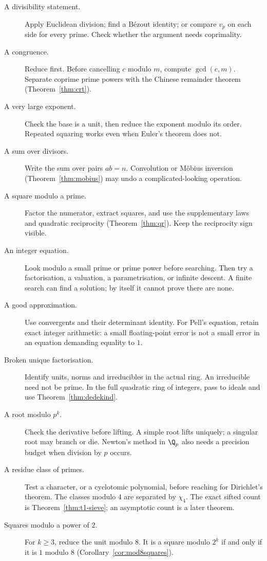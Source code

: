 \begin{description}
\item[A divisibility statement.] Apply Euclidean division; find a B\'ezout identity; or compare $v_p$ on each
side for every prime. Check whether the argument needs coprimality.
\item[A congruence.] Reduce first. Before cancelling $c$ modulo $m$, compute $\gcd(c,m)$. Separate coprime prime
powers with the Chinese remainder theorem (Theorem~\ref{thm:crt}).
\item[A very large exponent.] Check the base is a unit, then reduce the exponent modulo its order. Repeated
squaring works even when Euler's theorem does not.
\item[A sum over divisors.] Write the sum over pairs $ab=n$. Convolution or M\"obius inversion
(Theorem~\ref{thm:mobius}) may undo a complicated-looking operation.
\item[A square modulo a prime.] Factor the numerator, extract squares, and use the supplementary laws and
quadratic reciprocity (Theorem~\ref{thm:qr}). Keep the reciprocity sign visible.
\item[An integer equation.] Look modulo a small prime or prime power before searching. Then try a factorisation,
a valuation, a parametrisation, or infinite descent. A finite search can find a solution; by itself it cannot
prove there are none.
\item[A good approximation.] Use convergents and their determinant identity. For Pell's equation, retain exact
integer arithmetic: a small floating-point error is not a small error in an equation demanding equality to $1$.
\item[Broken unique factorisation.] Identify units, norms and irreducibles in the actual ring. An irreducible need
not be prime. In the full quadratic ring of integers, pass to ideals and use Theorem~\ref{thm:dedekind}.
\item[A root modulo $p^k$.] Check the derivative before lifting. A simple root lifts uniquely; a singular root
may branch or die. Newton's method in $\Q_p$ also needs a precision budget when division by $p$ occurs.
\item[A residue class of primes.] Test a character, or a cyclotomic polynomial, before reaching for Dirichlet's theorem. The classes modulo $4$ are separated by $\chi_4$. The exact sifted count is Theorem~\ref{thm:t1-sieve}; an asymptotic count is a later theorem.
\item[Squares modulo a power of $2$.] For $k\ge3$, reduce the unit modulo $8$. It is a square modulo $2^k$ if and only if it is $1$ modulo $8$ (Corollary~\ref{cor:mod8squares}).
\end{description}

